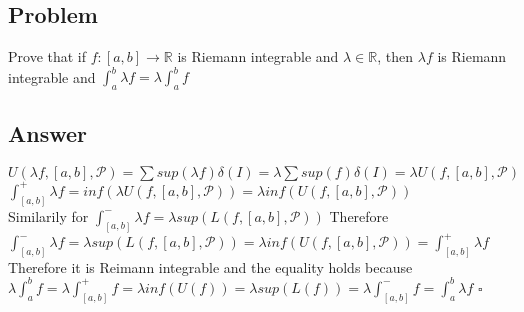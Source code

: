 \documentclass{article}
\newcommand\tab[1][1cm]{\hspace*{#1}}
\begin{document}
\subsection*{Problem}
Prove that if \(f:[a,b] \to \mathbb{R}\) is Riemann integrable and 
\(\lambda \in \mathbb{R}\), then \(\lambda f\) is Riemann integrable and
\tab[4cm] \(\int_{a}^{b}\lambda f = \lambda \int_{a}^{b}f\)

\subsection*{Answer}
\(U(\lambda f, [a,b], \mathcal{P}) = \sum sup(\lambda f) \delta(I) =
\lambda \sum sup(f) \delta(I) = \lambda U(f, [a,b], \mathcal{P})\) \\
\(\int_{[a,b]}^{+}\lambda f = inf(\lambda U(f, [a,b], \mathcal{P})) =
\lambda inf(U(f, [a,b], \mathcal{P}))\)\\
Similarily for \(\int_{[a,b]}^{-}\lambda f = \lambda sup(L(f, [a,b],\mathcal{P}))\)  
Therefore \(\int_{[a,b]}^{-}\lambda f = \lambda sup(L(f, [a,b],\mathcal{P})) = \lambda inf(U(f, [a,b], \mathcal{P})) = \int_{[a,b]}^{+}\lambda f\)
\\ Therefore it is Reimann integrable and the equality holds because
\(\lambda \int_{a}^{b}f = \lambda \int_{[a,b]}^{+}f = \lambda inf(U(f)) = \lambda sup(L(f)) = \lambda \int_{[a,b]}^{-}f = \int_{a}^{b}\lambda f\)
\(\square\) 
\end{document}
